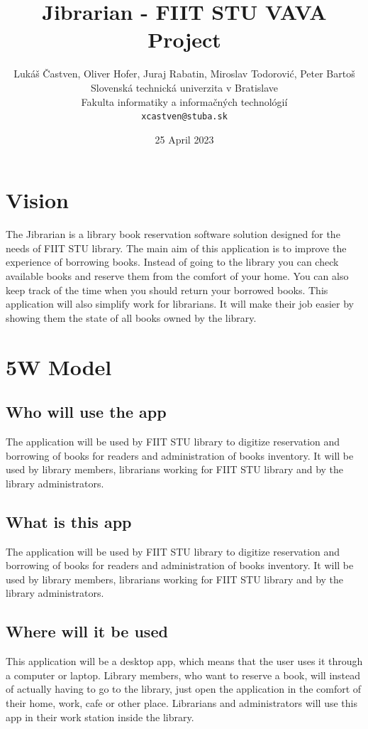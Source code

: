 \documentclass[11pt,twoside,a4paper]{article}
\title{Jibrarian - FIIT STU VAVA Project}
\author{Lukáš Častven, Oliver Hofer, Juraj Rabatin, Miroslav Todorović, Peter Bartoš\\[2pt]
	{\small Slovenská technická univerzita v Bratislave}\\
	{\small Fakulta informatiky a informačných technológií}\\
	{\small \texttt{xcastven@stuba.sk}}
	}
\date{\small 25 April 2023}
\begin{document}
\pagestyle{plain}

\maketitle
\tableofcontents
\pagebreak

\section{Vision}
The Jibrarian is a library book reservation software solution designed for the
needs of FIIT STU library. The main aim of this application is to improve the
experience of borrowing books. Instead of going to the library you can check
available books and reserve them from the comfort of your home. You can also
keep track of the time when you should return your borrowed books. This
application will also simplify work for librarians. It will make their job
easier by showing them the state of all books owned by the library.

\section{5W Model}

\subsection*{Who will use the app}
The application will be used by FIIT STU library to digitize reservation and
borrowing of books for readers and administration of books inventory. It will
be used by library members, librarians working for FIIT STU library and by
the library administrators.

\subsection*{What is this app}
The application will be used by FIIT STU library to digitize reservation and
borrowing of books for readers and administration of books inventory. It will
be used by library members, librarians working for FIIT STU library and by
the library administrators.

\subsection*{Where will it be used}
This application will be a desktop app, which means that the user uses it
through a computer or laptop. Library members, who want to reserve a book,
will instead of actually having to go to the library, just open the
application in the comfort of their home, work, cafe or other place.
Librarians and administrators will use this app in their work station inside
the library.
\end{document}
